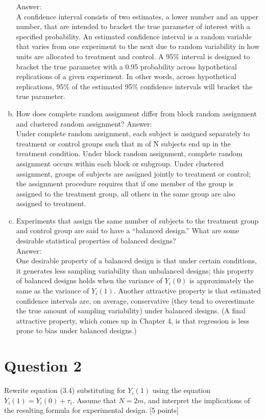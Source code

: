 \documentclass[11pt,notitlepage]{article}\usepackage[]{graphicx}\usepackage[]{color}
\begin{document}
\begin{enumerate}[a)]
Answer:\\ 
A confidence interval consists of two estimates, a lower number and an upper number, that are intended to bracket the true parameter of interest with a specified probability. An estimated confidence interval is a random variable that varies from one experiment to the next due to random variability in how units are allocated to treatment and control. A 95\% interval is designed to bracket the true parameter with a 0.95 probability across hypothetical replications of a given experiment.  In other words, across hypothetical replications, 95\% of the estimated 95\% confidence intervals will bracket the true parameter.  
\item How does complete random assignment differ from block random assignment and clustered random assignment?
Answer:\\
Under complete random assignment, each subject is assigned separately to treatment or control groups such that m of N subjects end up in the treatment condition. Under block random assignment, complete random assignment occurs within each block or subgroup. Under clustered assignment, groups of subjects are assigned jointly to treatment or control; the assignment procedure requires that if one member of the group is assigned to the treatment group, all others in the same group are also assigned to treatment. 
\item Experiments that assign the same number of subjects to the treatment group and control group are said to have a ``balanced design.''  What are some desirable statistical properties of balanced designs?\\
Answer:\\
One desirable property of a balanced design is that under certain conditions, it generates less sampling variability than unbalanced designs; this property of balanced designs holds when the variance of $Y_i(0)$ is approximately the same as the variance of $Y_i (1)$. Another attractive property is that estimated confidence intervals are, on average, conservative (they tend to overestimate the true amount of sampling variability) under balanced designs. (A final attractive property, which comes up in Chapter 4, is that regression is less prone to bias under balanced designs.)
\end{enumerate}

\section*{Question 2}
Rewrite equation (3.4) substituting for $Y_i (1)$ using the equation $Y_i (1) = Y_i (0) + \tau_i$.  Assume that $N=2m$, and interpret the implications of the resulting formula for experimental design. [5 points]
\end{document}
